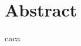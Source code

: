 \documentclass[12pt]{report}
\begin{document}

\section*{Abstract}
caca
\clearpage


\tableofcontents
\clearpage



\clearpage
\printbibliography
\end{document}
